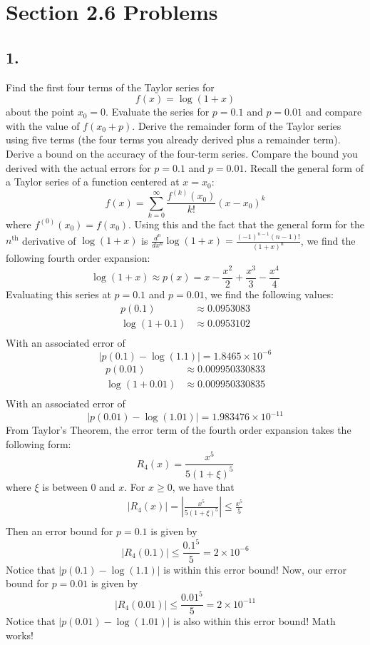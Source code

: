 \documentclass{article}
\begin{document}
\section*{Section 2.6 Problems}
\subsection*{1.} Find the first four terms of the Taylor series for 
\[f(x) = \log(1 + x)\]
about the point $x_0 = 0$. Evaluate the series for $p = 0.1$ and $p = 0.01$ and compare with the value of $f(x_0 + p)$. Derive the remainder form of the Taylor series using five terms (the four terms you already derived plus a remainder term). Derive a bound on the accuracy of the four-term series. Compare the bound you derived with the actual errors for $p = 0.1$ and $p = 0.01$.
\newline\newline
Recall the general form of a Taylor series of a function centered at $x = x_0$:
\[f(x) = \sum_{k=0}^{\infty}\frac{f^{(k)}(x_0)}{k!}(x-x_0)^k\]
where $f^{(0)}(x_0) = f(x_0)$. Using this and the fact that the general form for the $n^{\text{th}}$ derivative of $\log(1 + x)$ is $\frac{d^n}{dx^n}\log(1 + x) = \frac{(-1)^{n-1}(n-1)!}{(1 + x)^n}$, we find the following fourth order expansion:
\[\log(1 + x) \approx p(x) = x - \frac{x^2}{2} + \frac{x^3}{3} - \frac{x^4}{4}\]
Evaluating this series at $p = 0.1$ and $p = 0.01$, we find the following values:
\begin{align*}
    p(0.1) &\approx 0.0953083 \\
    \log(1 + 0.1) &\approx 0.0953102 \\
\end{align*}
With an associated error of 
\[|p(0.1) - \log(1.1)| = 1.8465 \times 10^{-6}\]
\begin{align*}
    p(0.01) &\approx 0.009950330833 \\
    \log(1 + 0.01) &\approx 0.009950330835 \\
\end{align*}
With an associated error of
\[|p(0.01) - \log(1.01)| = 1.983476 \times 10^{-11}\]
From Taylor's Theorem, the error term of the fourth order expansion takes the following form:
\[R_4(x) = \frac{x^5}{5(1 + \xi)^5}\]
where $\xi$ is between 0 and $x$. For $x \geq 0$, we have that 
\begin{align*}
    |R_4(x)| = \left|\frac{x^5}{5(1+\xi)^5}\right| \leq \frac{x^5}{5} \\
\end{align*}
Then an error bound for $p = 0.1$ is given by
\[|R_4(0.1)| \leq \frac{0.1^5}{5} = 2 \times 10^{-6}\]
Notice that $|p(0.1) - \log(1.1)|$ is within this error bound! Now, our error bound for $p = 0.01$ is given by
\[|R_4(0.01)| \leq \frac{0.01^5}{5} = 2 \times 10^{-11}\]
Notice that $|p(0.01) - \log(1.01)|$ is also within this error bound! Math works!
\end{document}
